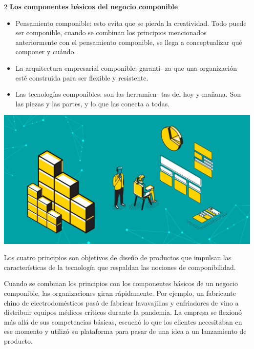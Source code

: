 \documentclass[12pt,spanish,Letterpaper,openany]{book}
\begin{document}
\begin {multicols}{2}
\textbf{Los componentes básicos del negocio componible}

\begin{itemize}
\item
  Pensamiento componible: esto evita que se pierda la creatividad. Todo puede ser componible, cuando se combinan los principios mencionados anteriormente con el pensamiento componible, se llega a conceptualizar qué componer y cuándo.
\item
  La arquitectura empresarial componible: garanti-
  za que una organización esté construida para ser flexible y resistente.
\item
  Las tecnologías componibles: son las herramien-
  tas del hoy y mañana. Son las piezas y las partes, y lo que las conecta a todas.
\end{itemize}

\begin {flushleft}
\noindent\begin{minipage}[c]{\columnwidth}

\begin{center}\includegraphics[width=1\linewidth]{images/cJuarez_image2} \end{center}

\end{minipage}
\end {flushleft}

Los cuatro principios son objetivos de diseño de productos que impulsan las características de la tecnología que respaldan las nociones de componibilidad.

Cuando se combinan los principios con los componentes básicos de un negocio componible, las organizaciones giran rápidamente. Por ejemplo, un fabricante chino de electrodomésticos pasó de fabricar lavavajillas y enfriadores de vino a distribuir equipos médicos críticos durante la pandemia. La empresa se flexionó más allá de sus competencias básicas, escuchó lo que los clientes necesitaban en ese momento y utilizó su plataforma para pasar de una idea a un lanzamiento de producto.


\end{multicols}
\end{document}
